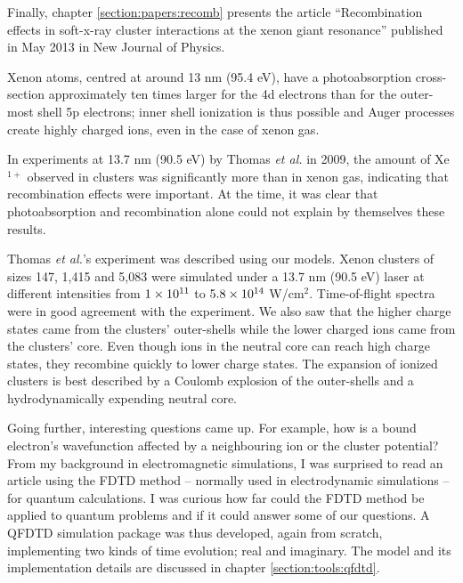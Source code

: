 
Finally, chapter \ref{section:papers:recomb} presents the article ``Recombination
effects in soft-x-ray cluster interactions at the xenon giant resonance''
published in May 2013 in New Journal of Physics.

Xenon atoms, centred at around 13 nm (95.4 eV), have a photoabsorption
cross-section approximately ten times larger for the 4d electrons than for the
outer-most shell 5p electrons; inner shell ionization is thus possible and
Auger processes create highly charged ions, even in the case of xenon
gas\cite{Uiberacker2007}.

In experiments at 13.7 nm (90.5 eV) by Thomas \textit{et al.} in
2009\cite{Thomas2009}, the amount of Xe$^{1+}$ observed in clusters was
significantly more than in xenon gas, indicating that recombination effects were
important. At the time, it was clear that photoabsorption and recombination alone
could not explain by themselves these results.

Thomas \textit{et al.}'s experiment was described using our models. Xenon
clusters of sizes 147, 1,415 and 5,083 were simulated under a 13.7 nm
(90.5 eV) laser at different intensities from $\ten{1}{11}$ to
$\ten{5.8}{14}$ W/cm$^2$. Time-of-flight spectra were in good agreement with the
experiment. We also saw that the higher charge states came from the clusters'
outer-shells while the lower charged ions came from the clusters' core. Even
though ions in the neutral core can reach high charge states, they recombine
quickly to lower charge states. The expansion of ionized clusters is best
described by a Coulomb explosion of the outer-shells and a hydrodynamically
expending neutral core.




Going further, interesting questions came up. For example, how is a bound
electron's wavefunction affected by a neighbouring ion or the cluster potential?
From my background in electromagnetic simulations, I was surprised to read
an article using the FDTD method -- normally used in electrodynamic simulations --
for quantum calculations. I was curious how far could the FDTD method be
applied to quantum problems and if it could answer some of our questions.
A QFDTD simulation package was thus developed, again from scratch,  implementing
two kinds of time evolution; real and imaginary. The model and its implementation details
are discussed in chapter \ref{section:tools:qfdtd}.

